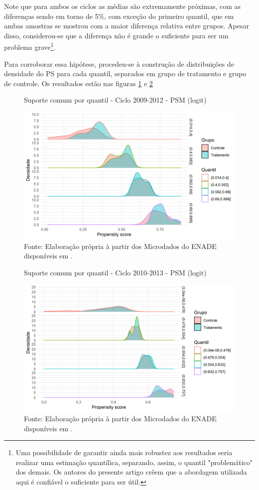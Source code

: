 Note que para ambos os ciclos as médias são extremamente próximas, com as diferenças sendo em torno de 5\%, com exceção do primeiro quantil, que em ambas amostras se mostrou com a maior diferença relativa entre grupos. Apesar disso, considerou-se que a diferença não é grande o suficiente para ser um problema grave\footnote{Uma possibilidade de garantir ainda mais robustez aos resultados seria realizar uma estimação quantílica, separando, assim, o quantil "problemático" dos demais. Os autores do presente artigo crêem que a abordagem utilizada aqui é confiável o suficiente para ser útil.}.

Para corroborar essa hipótese, procedeu-se à construção de distribuições de densidade do PS para cada quantil, separados em grupo de tratamento e grupo de controle. Os resultados estão nas figuras \ref{fig:PSM_quantil_2009_2012} e \ref{fig:PSM_quantil_2010_2013}

\begin{figure}[H]
	\centering
	\caption{Suporte comum por quantil - Ciclo 2009-2012 - PSM (logit)}
	\label{fig:PSM_quantil_2009_2012}
	\includegraphics[width=0.7\linewidth]{"Figuras/suporte_comum_2009_2012_quantis.png"}
\caption*{\RaggedRight Fonte: Elaboração própria à partir dos Microdados do ENADE disponíveis em \cite{INEP2020}.}
\end{figure}

\begin{figure}[H]
	\centering
	\caption{Suporte comum por quantil - Ciclo 2010-2013 - PSM (logit)}
	\label{fig:PSM_quantil_2010_2013}
	\includegraphics[width=0.7\linewidth]{"Figuras/suporte_comum_2010_2013_quantis.png"}
	\caption*{\RaggedRight Fonte: Elaboração própria à partir dos Microdados do ENADE disponíveis em \cite{INEP2020}.}
\end{figure}

